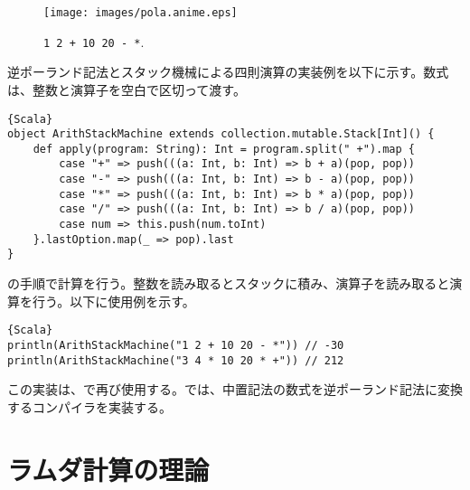 \documentclass[10pt,a4paper]{book}
\begin{document}
\begin{figure}[h]
\centering
\texttt{[image: images/pola.anime.eps]}
\caption{\texttt{1 2 + 10 20 - *}.\label{fig:math}}
\end{figure}

逆ポーランド記法とスタック機械による四則演算の実装例を以下に示す。数式は、整数と演算子を空白で区切って渡す。

\begin{Verbatim}{Scala}
object ArithStackMachine extends collection.mutable.Stack[Int]() {
	def apply(program: String): Int = program.split(" +").map {
		case "+" => push(((a: Int, b: Int) => b + a)(pop, pop))
		case "-" => push(((a: Int, b: Int) => b - a)(pop, pop))
		case "*" => push(((a: Int, b: Int) => b * a)(pop, pop))
		case "/" => push(((a: Int, b: Int) => b / a)(pop, pop))
		case num => this.push(num.toInt)
	}.lastOption.map(_ => pop).last
}
\end{Verbatim}

の手順で計算を行う。整数を読み取るとスタックに積み、演算子を読み取ると演算を行う。以下に使用例を示す。

\begin{Verbatim}{Scala}
println(ArithStackMachine("1 2 + 10 20 - *")) // -30
println(ArithStackMachine("3 4 * 10 20 * +")) // 212
\end{Verbatim}

この実装は、で再び使用する。では、中置記法の数式を逆ポーランド記法に変換するコンパイラを実装する。

\chapter{ラムダ計算の理論\label{chap:lambda}}
\end{document}
